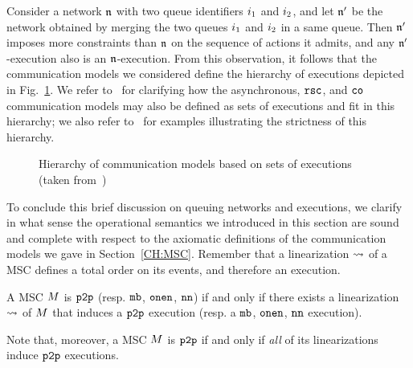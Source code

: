 Consider a network $\mathfrak{n}$ with two queue identifiers $i_1$ and $i_2$,
and let $\mathfrak{n}'$ be the network obtained by merging the two queues $i_1$ and $i_2$ in a
same queue. Then $\mathfrak{n}'$ imposes more constraints than $\mathfrak{n}$ on the sequence of actions it admits,
and any $\mathfrak{n}'$-execution also is an $\mathfrak{n}$-execution. From this observation, it follows that
the communication models we considered define the hierarchy of executions depicted in
Fig.~\ref{fig:hierarchy-of-executions}. We refer
to~\cite{DBLP:journals/fac/ChevrouHQ16}
for clarifying how the asynchronous, $\mathtt{rsc}$, and $\mathtt{co}$ communication models may
also be defined as sets of executions and fit in this hierarchy; we also refer
to~\cite{DBLP:journals/fac/ChevrouHQ16} for examples illustrating
the strictness of this hierarchy.

\begin{figure}
    \centering
    
    \caption{\label{fig:hierarchy-of-executions} Hierarchy of communication models based on  sets of
    executions (taken from~\cite{DBLP:journals/fac/ChevrouHQ16})}
\end{figure}

To conclude this brief discussion on queuing networks and executions, we clarify in what sense the operational semantics we introduced in this section are sound and complete with respect to the axiomatic definitions of the communication models we gave in Section~\ref{CH:MSC}. Remember that a linearization $\rightsquigarrow$ of a MSC
defines a total order on its events, and therefore an execution.

\begin{fact}
A MSC $M$ is $\mathtt{p2p}$ (resp. $\mathtt{mb}$, $\mathtt{onen}$, $\mathtt{nn}$) if and only if there exists
a linearization $\rightsquigarrow$ of $M$ that induces a $\mathtt{p2p}$ execution (resp. a $\mathtt{mb}$, $\mathtt{onen}$, $\mathtt{nn}$ execution).
\end{fact}

Note that, moreover, a MSC $M$ is $\mathtt{p2p}$ if and only if \emph{all} of its linearizations induce $\mathtt{p2p}$ executions.